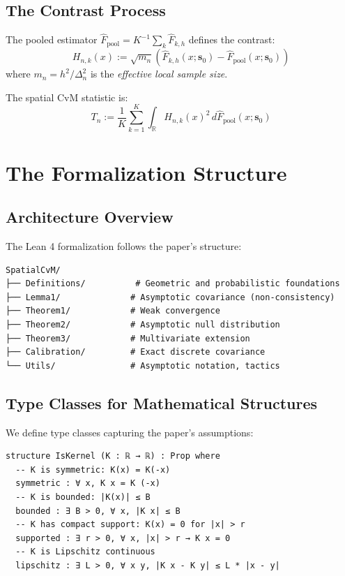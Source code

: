 \documentclass[11pt,a4paper]{article}
\theoremstyle{definition}
\begin{document}
\subsection{The Contrast Process}

The pooled estimator $\hat{F}_{\text{pool}} = K^{-1}\sum_k \hat{F}_{k,h}$ defines the contrast:
\[
H_{n,k}(x) := \sqrt{m_n}\left(\hat{F}_{k,h}(x; \mathbf{s}_0) - \hat{F}_{\text{pool}}(x; \mathbf{s}_0)\right)
\]
where $m_n = h^2/\Delta_n^2$ is the \emph{effective local sample size}.

The spatial CvM statistic is:
\[
T_n := \frac{1}{K}\sum_{k=1}^{K} \int_{\mathbb{R}} H_{n,k}(x)^2 \, d\hat{F}_{\text{pool}}(x; \mathbf{s}_0)
\]

\section{The Formalization Structure}
\label{sec:formalization}

\subsection{Architecture Overview}

The Lean 4 formalization follows the paper's structure:

\begin{verbatim}
SpatialCvM/
├── Definitions/          # Geometric and probabilistic foundations
├── Lemma1/              # Asymptotic covariance (non-consistency)
├── Theorem1/            # Weak convergence
├── Theorem2/            # Asymptotic null distribution
├── Theorem3/            # Multivariate extension
├── Calibration/         # Exact discrete covariance
└── Utils/               # Asymptotic notation, tactics
\end{verbatim}

\subsection{Type Classes for Mathematical Structures}

We define type classes capturing the paper's assumptions:

\begin{lstlisting}[caption={Kernel Structure in Lean 4}]
structure IsKernel (K : ℝ → ℝ) : Prop where
  -- K is symmetric: K(x) = K(-x)
  symmetric : ∀ x, K x = K (-x)
  -- K is bounded: |K(x)| ≤ B
  bounded : ∃ B > 0, ∀ x, |K x| ≤ B
  -- K has compact support: K(x) = 0 for |x| > r
  supported : ∃ r > 0, ∀ x, |x| > r → K x = 0
  -- K is Lipschitz continuous
  lipschitz : ∃ L > 0, ∀ x y, |K x - K y| ≤ L * |x - y|
\end{lstlisting}
\end{document}
